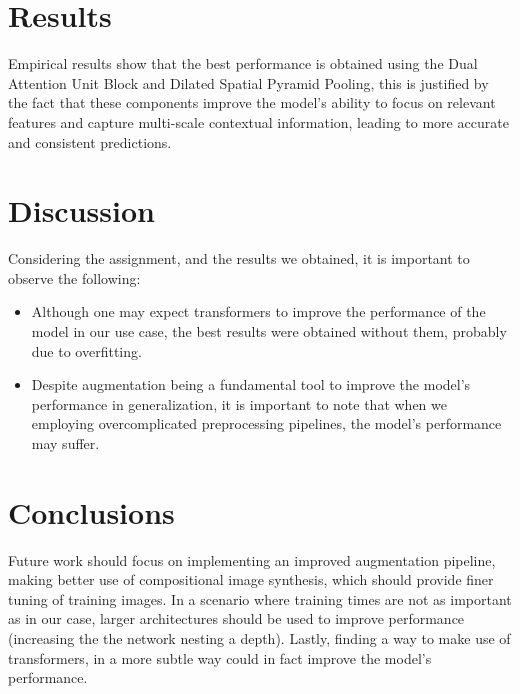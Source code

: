 \documentclass[11pt]{article}
\begin{document}
\begin{multicols}{2}
        \section{Results}
        Empirical results show that the best performance is obtained using the Dual Attention Unit Block and Dilated Spatial Pyramid Pooling, this is justified by the fact that these components improve the model's ability to focus on relevant features and capture multi-scale contextual information, leading to more accurate and consistent predictions.
        \section{Discussion}
        Considering the assignment, and the results we obtained, it is important to observe the following:
        \begin{itemize}
            \item Although one may expect transformers to improve the performance of the model in our use case, the best results were obtained without them, probably due to overfitting.
            \item Despite augmentation being a fundamental tool to improve the model's performance in generalization, it is important to note that when we employing overcomplicated preprocessing pipelines, the model's performance may suffer.
        \end{itemize}
        \section{Conclusions}
        Future work should focus on implementing an improved augmentation pipeline, making better use of compositional image synthesis, which should provide finer tuning of training images. In a scenario where training times are not as important as in our case, larger architectures should be used to improve performance (increasing the the network nesting a depth). Lastly, finding a way to make use of transformers, in a more subtle way could in fact improve the model's performance.  
        
        
    
    \end{multicols}
\end{document}
